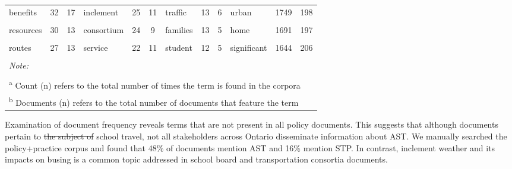 \documentclass[preprint, 3p,
authoryear]{elsarticle} %
\providecommand{\DIFdeltex}[1]{{\protect\color{red}\sout{#1}}}                      %
\providecommand{\DIFdelbegin}{} %
\providecommand{\DIFdelend}{} %
\providecommand{\DIFdel}[1]{\texorpdfstring{\DIFdeltex{#1}}{}} %
\newcommand{\DIFscaledelfig}{0.5}
\newlength{\DIFdelgraphicswidth} %
\newlength{\DIFdelgraphicsheight} %
\newcommand{\DIFdelincludegraphics}[2][]{%
\sbox{\DIFdelgraphicsbox}{\DIFOincludegraphics[#1]{#2}}%
\settoboxwidth{\DIFdelgraphicswidth}{\DIFdelgraphicsbox} %
\settoboxtotalheight{\DIFdelgraphicsheight}{\DIFdelgraphicsbox} %
\scalebox{\DIFscaledelfig}{%
\parbox[b]{\DIFdelgraphicswidth}{\usebox{\DIFdelgraphicsbox}\\[-\baselineskip] \rule{\DIFdelgraphicswidth}{0em}}\llap{\resizebox{\DIFdelgraphicswidth}{\DIFdelgraphicsheight}{%
\setlength{\unitlength}{\DIFdelgraphicswidth}%
\begin{picture}(1,1)%
\thicklines\linethickness{2pt} %
{\color[rgb]{1,0,0}\put(0,0){\framebox(1,1){}}}%
{\color[rgb]{1,0,0}\put(0,0){\line( 1,1){1}}}%
{\color[rgb]{1,0,0}\put(0,1){\line(1,-1){1}}}%
\end{picture}%
}\hspace*{3pt}}} %
} %
\DeclareRobustCommand{\DIFdelbegin}{\DIFOdelbegin \let\includegraphics\DIFdelincludegraphics} %
\DeclareRobustCommand{\DIFdelend}{\DIFOaddend \let\includegraphics\DIFOincludegraphics} %
\begin{document}
\begin{table}
{\begin{tabular}[t]{lcclcclcclcc}
benefits & 32 & 17 & inclement & 25 & 11 & traffic & 13 & 6 & urban & 1749 & 198\\
\addlinespace
\cellcolor{gray!6}{play} & \cellcolor{gray!6}{31} & \cellcolor{gray!6}{2} & \cellcolor{gray!6}{eligibility} & \cellcolor{gray!6}{24} & \cellcolor{gray!6}{11} & \cellcolor{gray!6}{support} & \cellcolor{gray!6}{13} & \cellcolor{gray!6}{6} & \cellcolor{gray!6}{different} & \cellcolor{gray!6}{1695} & \cellcolor{gray!6}{213}\\
resources & 30 & 13 & consortium & 24 & 9 & families & 13 & 5 & home & 1691 & 197\\
\cellcolor{gray!6}{healthy} & \cellcolor{gray!6}{29} & \cellcolor{gray!6}{16} & \cellcolor{gray!6}{region} & \cellcolor{gray!6}{23} & \cellcolor{gray!6}{10} & \cellcolor{gray!6}{way} & \cellcolor{gray!6}{12} & \cellcolor{gray!6}{5} & \cellcolor{gray!6}{social} & \cellcolor{gray!6}{1672} & \cellcolor{gray!6}{189}\\
routes & 27 & 13 & service & 22 & 11 & student & 12 & 5 & significant & 1644 & 206\\
\cellcolor{gray!6}{lanes} & \cellcolor{gray!6}{26} & \cellcolor{gray!6}{3} & \cellcolor{gray!6}{•} & \cellcolor{gray!6}{21} & \cellcolor{gray!6}{1} & \cellcolor{gray!6}{region} & \cellcolor{gray!6}{12} & \cellcolor{gray!6}{4} & \cellcolor{gray!6}{mobility} & \cellcolor{gray!6}{1634} & \cellcolor{gray!6}{136}\\
\bottomrule
\multicolumn{12}{l}{\rule{0pt}{1em}\textit{Note: }}\\
\multicolumn{12}{l}{\rule{0pt}{1em} }\\
\multicolumn{12}{l}{\rule{0pt}{1em}\textsuperscript{a} Count (n) refers to the total number of times the term is found in the corpora}\\
\multicolumn{12}{l}{\rule{0pt}{1em}\textsuperscript{b} Documents (n) refers to the total number of documents that feature the term}\\
\end{tabular}}
\end{table}

Examination of document frequency reveals terms that are not present in
all policy documents. This suggests that although documents pertain to
\DIFdelbegin \DIFdel{the subject of }\DIFdelend school travel, not all stakeholders across Ontario disseminate
information about AST. We manually searched the policy+practice corpus
and found that 48\% of documents mention AST and 16\% mention STP. In
contrast, inclement weather and its impacts on busing is a common topic
addressed in school board and transportation consortia documents.
\end{document}
